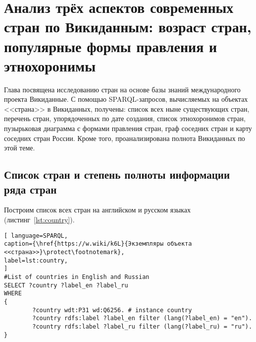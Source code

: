 \chapter[Анализ стран: возраст, формы правления и этнохоронимы]{Анализ трёх аспектов современных стран по Викиданным: возраст стран, популярные формы правления и этнохоронимы}
\label{ch:country}

Глава посвящена исследованию стран на основе базы знаний международного проекта Викиданные. С помощью SPARQL-запросов, вычисляемых на объектах <<страна>> в Викиданных, получены: список всех ныне существующих стран, перечень стран, упорядоченных по дате создания, список этнохоронимов стран, пузырьковая диаграмма с формами правления стран, граф соседних стран и карту соседних стран России. Кроме того, проанализирована полнота Викиданных по этой теме.

\begin{marginfigure}[0.0cm]
	{
		\setlength{\fboxsep}{0pt}%
		\setlength{\fboxrule}{1pt}%
	}
	\caption{
		Высокая степень заполнения по числу свойств объекта Викиданных \href{https://www.wikidata.org/wiki/Q6256}{страна (Q6256)}.  Данные получены с помощью сервиса \href{https://prowd.id/dashboards/86b6f91a8131/profile}{ProWD.id}, 2020 год. \emph{Коэффициент Джини равен 0.091.}
	}%
	\label{fig:ProWD_country}%
\end{marginfigure}


\section{Список стран и степень полноты информации ряда стран}

Построим список всех стран на английском и русском языках (листинг~\ref{lst:country}).

\begin{lstlisting}[ language=SPARQL, 
caption={\href{https://w.wiki/k6L}{Экземпляры объекта <<страна>>}\protect\footnotemark},
label=lst:country, 
]
#List of countries in English and Russian
SELECT ?country ?label_en ?label_ru
WHERE
{
		?country wdt:P31 wd:Q6256. # instance country
		?country rdfs:label ?label_en filter (lang(?label_en) = "en").
		?country rdfs:label ?label_ru filter (lang(?label_ru) = "ru").
}
\end{lstlisting}


